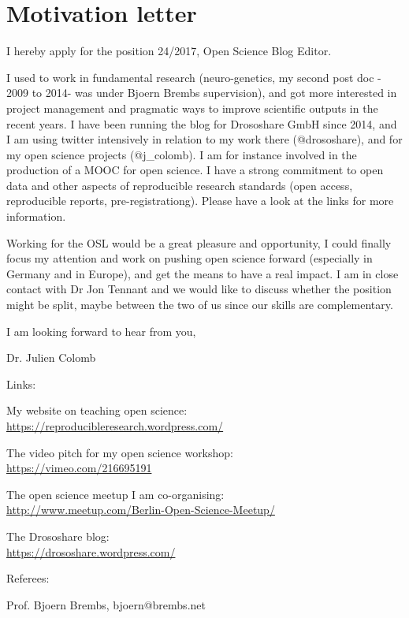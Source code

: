 \section* {Motivation letter}

I hereby apply for the position 24/2017, Open Science Blog Editor.



I used to work in fundamental research (neuro-genetics, my second post doc - 2009 to 2014- was under Bjoern Brembs supervision), and got more interested in project management and pragmatic ways to improve scientific outputs in the recent years. I have been running the blog for Drososhare GmbH since 2014, and I am using twitter intensively in relation to my work there (@drososhare), and for my open science projects (@j\_colomb). I am for instance involved in the production of a MOOC for open science. I have a strong commitment to open data and other aspects of reproducible research standards (open access, reproducible reports, pre-registrationg). Please have a look at the links for more information.


Working for the OSL would be a great pleasure and opportunity, I could finally focus my attention and work on pushing open science forward (especially in Germany and in Europe), and get the means to have a real impact. I am in close contact with Dr Jon Tennant and we would like to discuss whether the position might be split, maybe between the two of us since our skills are complementary.

I am looking forward to hear from you,

Dr. Julien Colomb

\vspace {1cm} 

Links:

My website on teaching open science: \\ \url{https://reproducibleresearch.wordpress.com/}

The video pitch for my open science workshop:   \\ \url{https://vimeo.com/216695191}

The open science meetup I am co-organising: \\ \url{http://www.meetup.com/Berlin-Open-Science-Meetup/}

The Drososhare blog: \\ \url{https://drososhare.wordpress.com/}



\vspace {0.5cm} 

Referees:

Prof. Bjoern Brembs, bjoern@brembs.net
